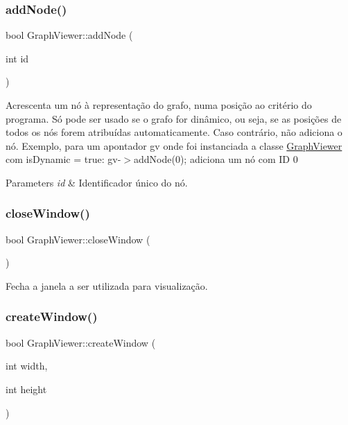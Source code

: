 \subsubsection{\texorpdfstring{add\+Node()}{addNode()}\hspace{0.1cm}{\footnotesize\ttfamily [2/2]}}
{\footnotesize\ttfamily bool Graph\+Viewer\+::add\+Node (\begin{DoxyParamCaption}\item[{int}]{id }\end{DoxyParamCaption})}

Acrescenta um nó à representação do grafo, numa posição ao critério do programa. Só pode ser usado se o grafo for dinâmico, ou seja, se as posições de todos os nós forem atribuídas automaticamente. Caso contrário, não adiciona o nó. Exemplo, para um apontador gv onde foi instanciada a classe \hyperlink{class_graph_viewer}{Graph\+Viewer} com is\+Dynamic = true\+: gv-\/$>$add\+Node(0); adiciona um nó com ID 0


\begin{DoxyParams}{Parameters}
{\em id} & Identificador único do nó. \\
\hline
\end{DoxyParams}
\hypertarget{class_graph_viewer_a85990c1eaac7feed3950960d4bd2fd4c}{}\label{class_graph_viewer_a85990c1eaac7feed3950960d4bd2fd4c} 
\subsubsection{\texorpdfstring{close\+Window()}{closeWindow()}}
{\footnotesize\ttfamily bool Graph\+Viewer\+::close\+Window (\begin{DoxyParamCaption}{ }\end{DoxyParamCaption})}

Fecha a janela a ser utilizada para visualização. \hypertarget{class_graph_viewer_ae5247dc66449dcd21fc5d531bbbaddfa}{}\label{class_graph_viewer_ae5247dc66449dcd21fc5d531bbbaddfa} 
\subsubsection{\texorpdfstring{create\+Window()}{createWindow()}}
{\footnotesize\ttfamily bool Graph\+Viewer\+::create\+Window (\begin{DoxyParamCaption}\item[{int}]{width,  }\item[{int}]{height }\end{DoxyParamCaption})}

